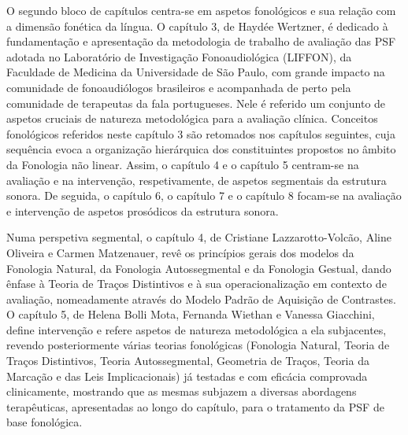 \begin{refsection}
O segundo bloco de capítulos centra-se em aspetos fonológicos e sua relação com a dimensão fonética da língua. O capítulo 3, de Haydée Wertzner, é dedicado à fundamentação e apresentação da metodologia de trabalho de avaliação das PSF adotada no Laboratório de Investigação Fonoaudiológica (LIFFON), da Faculdade de Medicina da Universidade de São Paulo, com grande impacto na comunidade de fonoaudiólogos brasileiros e acompanhada de perto pela comunidade de terapeutas da fala portugueses. Nele é referido um conjunto de aspetos cruciais de natureza metodológica para a avaliação clínica. Conceitos fonológicos referidos neste capítulo 3 são retomados nos capítulos seguintes, cuja sequência evoca a organização hierárquica dos constituintes propostos no âmbito da Fonologia não linear. Assim, o capítulo 4 e o capítulo 5 centram-se na avaliação e na intervenção, respetivamente, de aspetos segmentais da estrutura sonora. De seguida, o capítulo 6, o capítulo 7 e o capítulo 8 focam-se na avaliação e intervenção de aspetos prosódicos da estrutura sonora.

Numa perspetiva segmental, o capítulo 4, de Cristiane Lazzarotto-Volcão, Aline Oliveira e Carmen Matzenauer, revê os princípios gerais dos modelos da Fonologia Natural, da Fonologia Autossegmental e da Fonologia Gestual, dando ênfase à Teoria de Traços Distintivos e à sua operacionalização em contexto de avaliação, nomeadamente através do Modelo Padrão de Aquisição de Contrastes. O capítulo 5, de Helena Bolli Mota, Fernanda Wiethan e Vanessa Giacchini, define intervenção e refere aspetos de natureza metodológica a ela subjacentes, revendo posteriormente várias teorias fonológicas (Fonologia Natural, Teoria de Traços Distintivos, Teoria Autossegmental, Geometria de Traços, Teoria da Marcação e das Leis Implicacionais) já testadas e com eficácia comprovada clinicamente, mostrando que as mesmas subjazem a diversas abordagens terapêuticas, apresentadas ao longo do capítulo, para o tratamento da PSF de base fonológica. 


\end{refsection}
